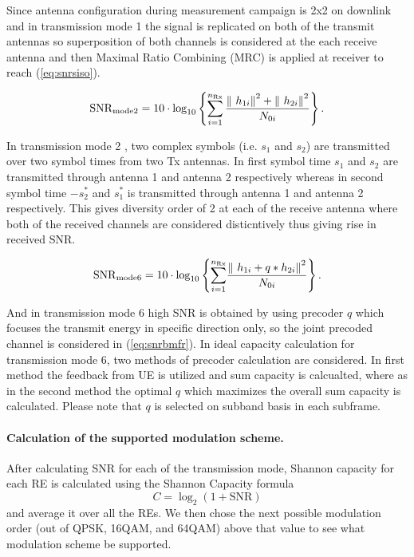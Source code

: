 \documentclass[a4paper,10pt]{article}
\begin{document}
Since antenna configuration during measurement campaign is 2x2 on downlink and in transmission mode 1 the signal is replicated on both of the transmit antennas so superposition of both channels is considered at the each receive antenna and then Maximal Ratio Combining (MRC) is applied at receiver to reach (\ref{eq:snrsiso}). 
 
\begin{equation} \label{eq:snralam}
\mathrm{SNR}_{\mathrm{mode2}} = 10\cdot{\mathrm{log}}_{10} \left\lbrace {\sum_{i=1}^{n_{\mathrm{Rx}}}} \, {\frac{ {\| \ {h_{1i}} \| \\}^2 +  {\| \ {h_{2i}} \| \\}^2 }{N_{0i}}}\right\rbrace. 
\end{equation}

In transmission mode 2 , two complex symbols (i.e. $s_1$ and $s_2$) are transmitted over two symbol times from two Tx antennas. In first symbol time $s_1$ and $s_2$ are transmitted through antenna 1 and antenna 2 respectively whereas in second symbol time $-{s_{2}^{*}}$ and ${s_{1}^{*}}$ is transmitted through antenna 1 and antenna 2 respectively. This gives diversity order of 2 at each of the receive antenna where both of the received channels are considered disticntively thus giving rise in received SNR. 

\begin{equation} \label{eq:snrbmfr}
\mathrm{SNR}_{\mathrm{mode6}} = 10\cdot{\mathrm{log}}_{10} \left\lbrace {\sum_{i=1}^{n_{\mathrm{Rx}}}} {\frac{{\| \ {h_{1i}} + q*{h_{2i}} \| \\}^2}{N_{0i}}}\right\rbrace. 
\end{equation}

And in transmission mode 6 high SNR is obtained by using precoder $q$ which focuses the transmit energy in specific direction only, so the joint precoded channel is considered in (\ref{eq:snrbmfr}). In ideal capacity calculation for transmission mode 6, two methods of precoder calculation are considered. In first method the feedback from UE is utilized and sum capacity is calcualted, where as in the second method the optimal $q$ which maximizes the overall sum capacity is calculated. Please note that $q$ is selected on subband basis in each subframe.

\paragraph{Calculation of the supported modulation scheme.}
After calculating SNR for each of the transmission mode, Shannon capacity for each RE is calculated using the Shannon Capacity formula $$C = \log_2(1 + \mathrm{SNR})$$ and average it over all the REs. We then chose the next possible modulation order (out of QPSK, 16QAM, and 64QAM) above that value  to see what modulation scheme be supported. 
\end{document}
